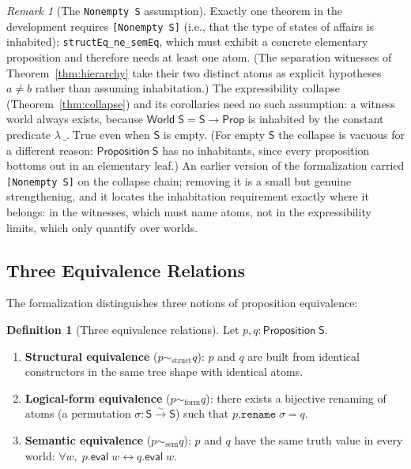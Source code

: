 \documentclass[10pt, letterpaper]{article}
\theoremstyle{definition}
\newtheorem{definition}[theorem]{Definition}
\theoremstyle{remark}
\newtheorem{remark}[theorem]{Remark}
\newcommand{\Sach}{\mathsf{S}}
\newcommand{\Prop}{\mathsf{Prop}}
\newcommand{\eval}{\mathsf{eval}}
\newcommand{\structEq}{\sim_{\mathrm{struct}}}
\newcommand{\formEq}{\sim_{\mathrm{form}}}
\newcommand{\semEq}{\sim_{\mathrm{sem}}}
\begin{document}
\begin{remark}[The \texttt{Nonempty S} assumption]
\label{rem:nonempty}
Exactly one theorem in the development requires
\texttt{[Nonempty S]} (i.e., that the type of states of affairs
is inhabited): \texttt{structEq\_ne\_semEq}, which must exhibit
a concrete elementary proposition and therefore needs at least
one atom.  (The separation witnesses of
Theorem~\ref{thm:hierarchy} take their two distinct atoms as
explicit hypotheses $a \neq b$ rather than assuming
inhabitation.)  The expressibility collapse
(Theorem~\ref{thm:collapse}) and its corollaries need no such
assumption: a witness world always exists, because
$\mathsf{World}\;\Sach = \Sach \to \Prop$ is inhabited by the
constant predicate $\lambda\,\_.\;\mathrm{True}$ even when
$\Sach$ is empty.  (For empty $\Sach$ the collapse is vacuous
for a different reason: $\mathsf{Proposition}\;\Sach$ has no
inhabitants, since every proposition bottoms out in an elementary
leaf.)  An earlier version of the formalization carried
\texttt{[Nonempty S]} on the collapse chain; removing it is a
small but genuine strengthening, and it locates the inhabitation
requirement exactly where it belongs: in the witnesses, which
must name atoms, not in the expressibility limits, which only
quantify over worlds.
\end{remark}

\subsection{Three Equivalence Relations}
\label{sec:hierarchy}

The formalization distinguishes three notions of proposition
equivalence:

\begin{definition}[Three equivalence relations]
\label{def:hierarchy}
Let $p, q : \mathsf{Proposition}\;\Sach$.
\begin{enumerate}[nosep]
  \item \textbf{Structural equivalence} ($p \structEq q$):
    $p$ and $q$ are built from identical constructors in the
    same tree shape with identical atoms.
  \item \textbf{Logical-form equivalence} ($p \formEq q$):
    there exists a bijective renaming of atoms (a permutation
    $\sigma : \Sach \xrightarrow{\sim} \Sach$) such that
    $p.\mathtt{rename}\;\sigma = q$.
  \item \textbf{Semantic equivalence} ($p \semEq q$):
    $p$ and $q$ have the same truth value in every world:
    $\forall w,\; p.\eval\;w \leftrightarrow q.\eval\;w$.
\end{enumerate}
\end{definition}
\end{document}
